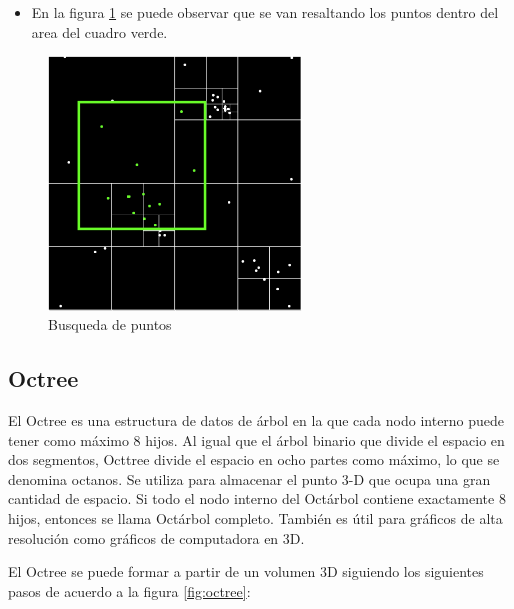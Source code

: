 \documentclass{article}
\begin{document}
\begin{itemize}
\item En la figura \ref{fig:quadtree_search} se puede observar que se van resaltando los puntos dentro del area del cuadro verde.
\end{itemize}

\begin{figure}[htbp]
\centering
\includegraphics[width=0.6\textwidth]{img/quadtree_search.png}
\caption{Busqueda de puntos}
\label{fig:quadtree_search}
\end{figure}

\subsection{Octree}

 El Octree es una estructura de datos de árbol en la que cada nodo interno puede tener como máximo 8 hijos. Al igual que el árbol binario que divide el espacio en dos segmentos, Octtree divide el espacio en ocho partes como máximo, lo que se denomina octanos. Se utiliza para almacenar el punto 3-D que ocupa una gran cantidad de espacio. Si todo el nodo interno del Octárbol contiene exactamente 8 hijos, entonces se llama Octárbol completo. También es útil para gráficos de alta resolución como gráficos de computadora en 3D.
           
El Octree se puede formar a partir de un volumen 3D siguiendo los siguientes pasos de acuerdo a la figura \ref{fig:octree}:
           
\end{document}

